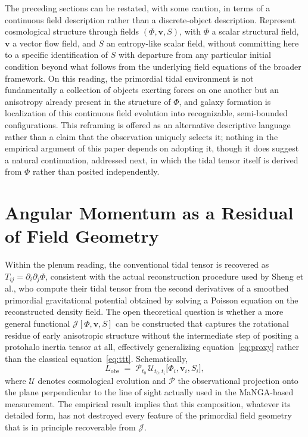 \documentclass[11pt]{article}
\begin{document}
The preceding sections can be restated, with some caution, in terms of a continuous field description rather than a discrete-object description. Represent cosmological structure through fields $(\Phi, \mathbf v, S)$, with $\Phi$ a scalar structural field, $\mathbf v$ a vector flow field, and $S$ an entropy-like scalar field, without committing here to a specific identification of $S$ with departure from any particular initial condition beyond what follows from the underlying field equations of the broader framework. On this reading, the primordial tidal environment is not fundamentally a collection of objects exerting forces on one another but an anisotropy already present in the structure of $\Phi$, and galaxy formation is localization of this continuous field evolution into recognizable, semi-bounded configurations. This reframing is offered as an alternative descriptive language rather than a claim that the observation uniquely selects it; nothing in the empirical argument of this paper depends on adopting it, though it does suggest a natural continuation, addressed next, in which the tidal tensor itself is derived from $\Phi$ rather than posited independently.

\section{Angular Momentum as a Residual of Field Geometry}

Within the plenum reading, the conventional tidal tensor is recovered as $T_{ij} = \partial_i \partial_j \Phi$, consistent with the actual reconstruction procedure used by Sheng et al., who compute their tidal tensor from the second derivatives of a smoothed primordial gravitational potential obtained by solving a Poisson equation on the reconstructed density field. The open theoretical question is whether a more general functional $\mathcal J[\Phi, \mathbf v, S]$ can be constructed that captures the rotational residue of early anisotropic structure without the intermediate step of positing a protohalo inertia tensor at all, effectively generalizing equation~\eqref{eq:proxy} rather than the classical equation~\eqref{eq:ttt}. Schematically,
\begin{equation}
L_{\mathrm{obs}} \;=\; \mathcal P_{t_0}\, \mathcal U_{t_0, t_i}\big[\Phi_i, \mathbf v_i, S_i\big],
\end{equation}
where $\mathcal U$ denotes cosmological evolution and $\mathcal P$ the observational projection onto the plane perpendicular to the line of sight actually used in the MaNGA-based measurement. The empirical result implies that this composition, whatever its detailed form, has not destroyed every feature of the primordial field geometry that is in principle recoverable from $\mathcal J$.
\end{document}
